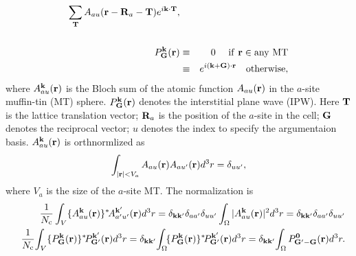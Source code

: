\documentclass[a4paper,10pt,epsf,fleqn]{article}
\begin{document}
{{{\begin{thebibliography}{00}
\begin{eqnarray}
          \sum_{\bf T} A_{a u}({\bf r-R}_a-{\bf T})e^{i{\bf k\cdot T}}, \\
\nonumber \\
P^{\bf k}_{\bf G}({\bf r}) &\equiv& 0  \ \ \ {\rm \ if \ {\bf r} \in any \ MT} 
\nonumber \\
        &\equiv& e^{i({\bf k+G})\cdot{\bf r}} \ \ \ {\rm otherwise},
\end{eqnarray}
where $A^{\bf k}_{a u}({\bf r})$ is the Bloch sum of
the atomic function $A_{au}({\bf r})$ in the $a$-site muffin-tin (MT) sphere.
$P^{\bf k}_{\bf G}({\bf r})$ denotes the interstitial plane wave (IPW).
Here ${\bf T}$ is the lattice translation vector;
${\bf R}_a$ is the position of the $a$-site in the cell;
${\bf G}$ denotes the reciprocal vector; %
$u$ denotes the index to specify the argumentaion basis. 
$A^{\bf k}_{a u}({\bf r})$ is orthnormlized as
\begin{eqnarray}
\int_{|{\bf r}| < V_a} A_{a u}({\bf r})A_{a u'}({\bf r}) d^3r =\delta_{u u'},
\end{eqnarray}
where $V_a$ is the size of the $a$-site MT.
The normalization is
\begin{eqnarray}
&&
\frac{1}{N_{\rm c}}\int_V \{A^{\bf k}_{a u}({\bf r})\}^* 
\!A^{\bf k'}_{a' u'}({\bf r}) d^3r = 
\delta_{\bf k k'} \delta_{aa'}\delta_{u u'}
\int_\Omega |A^{\bf k}_{a u}({\bf r})|^2 d^3r
= \delta_{\bf k k'} \delta_{aa'}\delta_{u u'} \\
&&\frac{1}{N_{\rm c}}\!
\int_V  \{ P^{\bf k}_{\bf G}({\bf r})\}^*\!
P^{\bf k'}_{\bf G'}({\bf r})  d^3r
= \delta_{\bf k k'}\!
\int_\Omega \!\{ P^{\bf k}_{\bf G}({\bf r}) \}^*\!
P^{\bf k'}_{\bf G'}({\bf r})  d^3r
= \delta_{\bf k k'}\!
\int_\Omega  P^{\bf 0}_{\bf G'-G}({\bf r}) d^3r.
\end{eqnarray}



\newpage

\end{thebibliography}}}}
\end{document}
